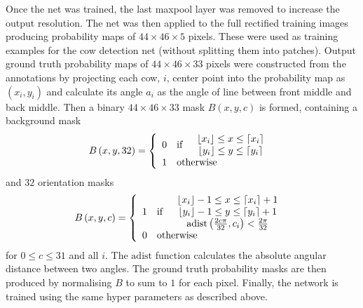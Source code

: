 \documentclass[10pt,a4paper,twocolumn]{article}
\begin{document}
Once the net was trained, the last maxpool layer was removed to increase the output resolution. The net was then applied to the full rectified training images producing probability maps of $44\times 46\times 5$ pixels. These were used as training examples for the cow detection net (without splitting them into patches). Output ground truth probability maps of $44\times 46\times 33$ pixels were constructed from the annotations by projecting each cow, $i$, center point into the probability map as $\left( x_i, y_i \right)$ and calculate its angle $a_i$ as the angle of line between front middle and back middle. Then a binary $44\times 46\times 33$ mask $B\left( x, y, c \right)$ is formed, containing a background mask
\begin{equation}
B\left( x, y, 32 \right) = \left\lbrace
\begin{array}{clc}
0 & \text{if} &
\begin{array}{c}
 \lfloor x_i \rfloor \leq x \leq \lceil x_i \rceil \\
 \lfloor y_i \rfloor \leq y \leq \lceil y_i \rceil
\end{array}
\\
1 & \multicolumn{2}{l}{\text{otherwise}}
\end{array}
\right.
\end{equation}
and $32$ orientation masks
\begin{equation}
B\left( x, y, c \right) = \left\lbrace
\begin{array}{clc}
1 & \text{if} &
\begin{array}{c}
 \lfloor x_i \rfloor-1 \leq x \leq \lceil x_i \rceil+1 \\
 \lfloor y_i \rfloor-1 \leq y \leq \lceil y_i \rceil+1 \\
 \mathrm{adist}\left(\frac{2c\pi}{32}, c_i\right) < \frac{2\pi}{32} \\
\end{array}
\\
0 & \multicolumn{2}{l}{\text{otherwise}}
\end{array}
\right.
\end{equation}
for $0\leq c \leq 31$ and all $i$. The $\mathrm{adist}$ function calculates the absolute angular distance between two angles. The ground truth probability masks are then produced by normalising $B$ to sum to $1$ for each pixel. Finally, the network is trained using the same hyper parameters as described above.
\end{document}
